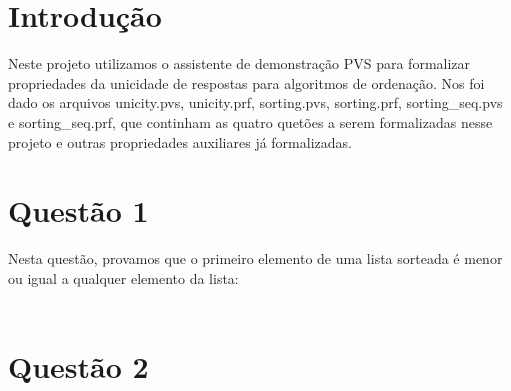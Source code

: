 \documentclass{article}
\begin{document}
  
\newcommand{\hmwkTitle}{\ Formalizacao de Unicidade de Respostas para Algoritmos de Ordenacao } %
\newcommand{\hmwkDueDate}{Domingo,\ 19\ de Junho\ 2016} %
\newcommand{\hmwkClass}{Logica Computacional 1\ Turma D} %
\newcommand{\hmwkClassTime}{} %
\newcommand{\hmwkClassInstructor}{Flavio L. C. Moura} %
\newcommand{\hmwkAuthorName}{Lucas M. Chagas (12/0126643) e Pedro Henrique S. Perruci (14/0158596)} %


\section{Introdução}

Neste projeto utilizamos o assistente de demonstração PVS para formalizar propriedades da unicidade de respostas para algoritmos de ordenação.
Nos foi dado os arquivos unicity.pvs, unicity.prf, sorting.pvs, sorting.prf, sorting_seq.pvs e sorting_seq.prf, que continham as quatro quetões a serem formalizadas nesse projeto e outras propriedades auxiliares já formalizadas.



\section{Questão 1}

Nesta questão, provamos que o primeiro elemento de uma lista sorteada  é menor ou igual a qualquer elemento da lista:
\\
\\



\section{Questão 2}
\end{document}
